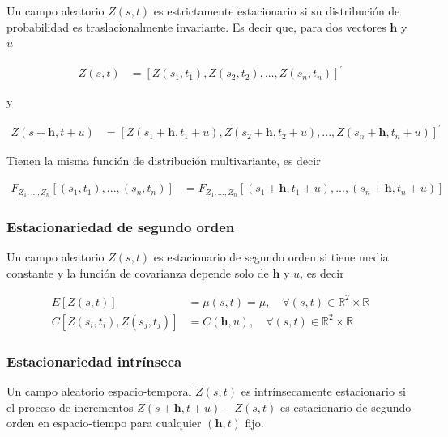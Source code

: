 \documentclass[
]{book}
\begin{document}
Un campo aleatorio \(Z(s,t)\) es estrictamente estacionario si su distribución de probabilidad es traslacionalmente invariante. Es decir que, para dos vectores \(\textbf{h}\) y \(u\)

\begin{align}
Z(s,t)&=[Z(s_1,t_1), Z(s_2,t_2),...,Z(s_n,t_n)]^{'}
\end{align}

y

\begin{align}
Z(s+\textbf{h},t+u)&=[Z(s_1+\textbf{h},t_1+u), Z(s_2+\textbf{h},t_2+u),...,Z(s_n+\textbf{h},t_n+u)]^{'}
\end{align}

Tienen la misma función de distribución multivariante, es decir

\begin{align}
F_{Z_1,...,Z_n}[(s_1,t_1),...,(s_n,t_n)]&= F_{Z_1,...,Z_n}[(s_1+\textbf{h},t_1+ u),...,(s_n+\textbf{h},t_n+u)]
\end{align}

\hypertarget{estacionariedad-de-segundo-orden-1}{%
\subsubsection*{Estacionariedad de segundo orden}\label{estacionariedad-de-segundo-orden-1}}

Un campo aleatorio \(Z(s,t)\) es estacionario de segundo orden si tiene media constante y la función de covarianza depende solo de \(\textbf{h}\) y \(u\), es decir

\begin{align}
E[Z(s,t)]&=\mu(s,t)=\mu,\quad \forall (s,t)\in \mathbb{R}^2\times \mathbb{R} \\
C[Z(s_i,t_i),Z(s_j,t_j)]&=C(\textbf{h}, u), \quad \forall(s,t) \in \mathbb{R}^2 \times \mathbb{R}
\end{align}

\hypertarget{estacionariedad-intruxednseca-1}{%
\subsubsection*{Estacionariedad intrínseca}\label{estacionariedad-intruxednseca-1}}

Un campo aleatorio espacio-temporal \(Z(s,t)\) es intrínsecamente estacionario si el proceso de incrementos \(Z(s+\textbf{h},t+u)-Z(s,t)\) es estacionario de segundo orden en espacio-tiempo para cualquier \((\textbf{h},t)\) fijo.
\end{document}
